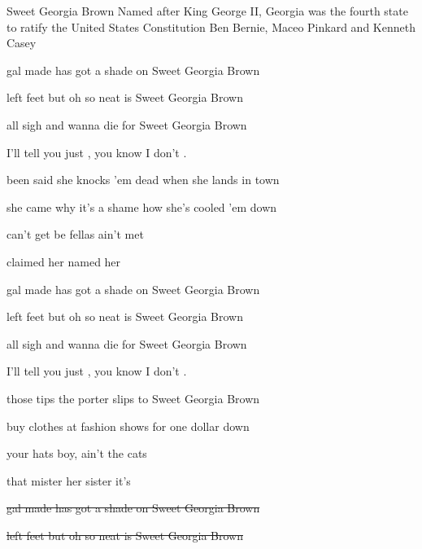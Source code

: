 \begin{SBSong}{Sweet Georgia Brown}
  {Named after King George II, Georgia was the fourth state to ratify the United States Constitution}
  {Ben Bernie, Maceo Pinkard and Kenneth Casey}
  \begin{SBVerse}
	 gal made has got a shade on Sweet Georgia Brown
	
	 left feet but oh so neat is Sweet Georgia Brown
	
	 all sigh and wanna die for Sweet Georgia Brown
	
	I'll tell you just , you know I don't .
	
	 been said she knocks 'em dead when she lands in town
	
	 she came why it's a shame how she's cooled 'em down
	
	  can't get  be fellas  ain't met
	
	 claimed her  named her
	
	  
  \end{SBVerse}
  \begin{SBVerse}
	 gal made has got a shade on Sweet Georgia Brown
	
	 left feet but oh so neat is Sweet Georgia Brown
	
	 all sigh and wanna die for Sweet Georgia Brown
	
	I'll tell you just , you know I don't .
	
	 those tips the porter slips to Sweet Georgia Brown
	
	 buy clothes at fashion shows for one dollar down
	
	  your hats  boy, ain't   the cats
	
	 that mister  her sister it's
	
	  
  \end{SBVerse}
  \CBPageBrk
  \begin{SBVerse}
	\sout{ gal made has got a shade on Sweet Georgia Brown}
	
	\sout{ left feet but oh so neat is Sweet Georgia Brown}
	

\end{SBVerse}
\end{SBSong}
